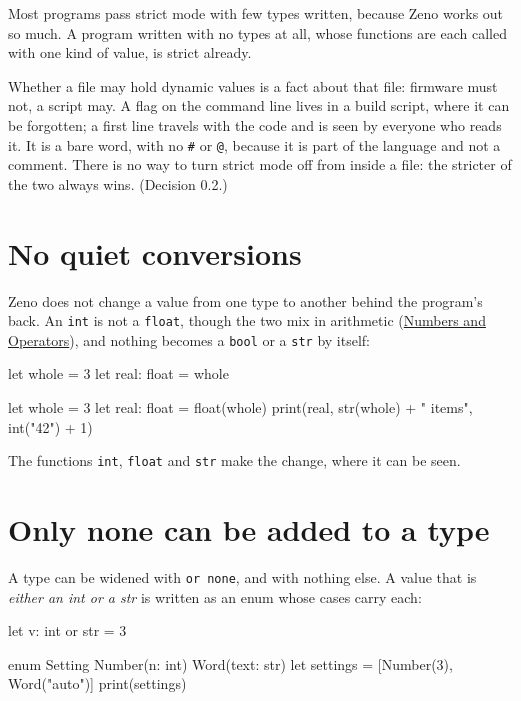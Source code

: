 Most programs pass strict mode with few types written, because Zeno
works out so much. A program written with no types at all, whose
functions are each called with one kind of value, is strict already.

\begin{why}
Whether a file may hold dynamic values is a fact about that file:
firmware must not, a script may. A flag on the command line lives in a
build script, where it can be forgotten; a first line travels with the
code and is seen by everyone who reads it. It is a bare word, with no
\verb|#| or \verb|@|, because it is part of the language and not a
comment. There is no way to turn strict mode off from inside a file:
the stricter of the two always wins. (Decision 0.2.)
\end{why}

\section{No quiet conversions}

Zeno does not change a value from one type to another behind the
program's back. An \verb|int| is not a \verb|float|, though the two
mix in arithmetic (\hyperref[ch-numbers]{Numbers and Operators}), and
nothing becomes a \verb|bool| or a \verb|str| by itself:

\begin{zeno}[fails=yes]
let whole = 3
let real: float = whole
\end{zeno}

\begin{zeno}
let whole = 3
let real: float = float(whole)
print(real, str(whole) + " items", int("42") + 1)
\end{zeno}

The functions \verb|int|, \verb|float| and \verb|str| make the change,
where it can be seen.

\section{Only none can be added to a type}

A type can be widened with \verb|or none|, and with nothing else. A
value that is \emph{either an int or a str} is written as an enum
whose cases carry each:

\begin{zeno}[fails=yes]
let v: int or str = 3
\end{zeno}

\begin{zeno}
enum Setting {
    Number(n: int)
    Word(text: str)
}
let settings = [Number(3), Word("auto")]
print(settings)
\end{zeno}

